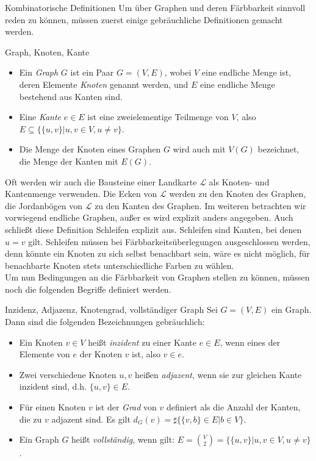 \begin{section}{Kombinatorische Definitionen}
  Um über Graphen und deren Färbbarkeit sinnvoll reden zu können, müssen zuerst einige gebräuchliche Definitionen gemacht werden. 
 
  \begin{definition}{Graph, Knoten, Kante}
    \-\ 
    \begin{itemize}
    \item Ein \textit{Graph} $G$ ist ein Paar $G=(V,E)$, wobei $V$ eine endliche Menge ist, deren Elemente \textit{Knoten} genannt werden, und $E$ eine endliche Menge bestehend aus Kanten sind.
    \item Eine \textit{Kante} $e \in E$ ist eine zweielementige Teilmenge von $V$, also $E \subseteq \{\{u,v\}|u,v \in V, u \neq v\}$.
    \item Die Menge der Knoten eines Graphen $G$ wird auch mit $V(G)$ bezeichnet, die Menge der Kanten mit $E(G)$.
    \end{itemize}
  \end{definition}
  
  Oft werden wir auch die Bausteine einer Landkarte $\mathcal{L}$ als Knoten- und Kantenmenge verwenden. Die Ecken von $\mathcal{L}$ werden zu den Knoten des Graphen, die Jordanbögen von $\mathcal{L}$ zu den Kanten des Graphen. Im weiteren betrachten wir vorwiegend endliche Graphen, außer es wird explizit anders angegeben. Auch schließt diese Definition Schleifen explizit aus. Schleifen sind Kanten, bei denen $u=v$ gilt. Schleifen müssen bei Färbbarkeitsüberlegungen ausgeschlossen werden, denn könnte ein Knoten zu sich selbst benachbart sein, wäre es nicht möglich, für benachbarte Knoten stets unterschiedliche Farben zu wählen.\\
  Um nun Bedingungen an die Färbbarkeit von Graphen stellen zu können, müssen noch die folgenden Begriffe definiert werden.
 
  \begin{definition}{Inzidenz, Adjazenz, Knotengrad, vollständiger Graph}
    Sei $G=(V,E)$ ein Graph. Dann sind die folgenden Bezeichnungen gebräuchlich:
    \begin{itemize}
    \item Ein Knoten $v \in V$ heißt \textit{inzident} zu einer Kante $e \in E$, wenn eines der Elemente von $e$ der Knoten $v$ ist, also $v \in e$. 
    \item Zwei verschiedene Knoten $u,v$ heißen \textit{adjazent}, wenn sie zur gleichen Kante inzident sind, d.h. $\{u,v\}\in E$.
    \item Für einen Knoten $v$ ist der \textit{Grad} von $v$ definiert als die Anzahl der Kanten, die zu $v$ adjazent sind. Es gilt $d_G(v) = \sharp\{\{v,b\} \in E | b\in V\}$.
    \item Ein Graph $G$ heißt \textit{vollständig}, wenn gilt: $E = \binom{V}{2} = \{\{u,v\}|u,v \in V, u \neq v\}$.
    

\end{itemize}
\end{definition}
\end{section}
